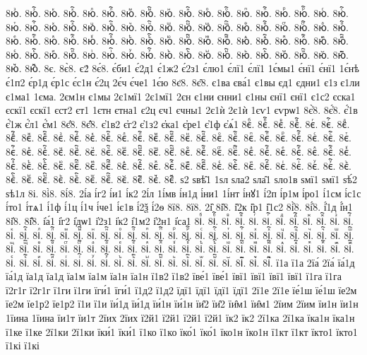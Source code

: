 {8юⷥ.
8юⷥ҇.
8юⷦ.
8юⷦ҇.
8юⷧ.
8юⷧ҇.
8юⷨ.
8юⷨ҇.
8юⷩ.
8юⷩ҇.
8юⷪ.
8юⷪ҇.
8юⷫ.
8юⷫ҇.
8юⷬ.
8юⷬ҇.
8юⷭ.
8юⷭ҇.
8юⷮ.
8юⷮ҇.
8юⷯ.
8юⷯ҇.
8юⷰ.
8юⷰ҇.
8юⷱ.
8юⷱ҇.
8юⷲ.
8юⷲ҇.
8юⷳ.
8юⷳ҇.
8юⷴ.
8юⷴ҇.
8юⷵ.
8юⷵ҇.
8юⷶ.
8юⷶ҇.
8юⷷ.
8юⷷ҇.
8юⷸ.
8юⷸ҇.
8юⷹ.
8юⷹ҇.
8юⷺ.
8юⷺ҇.
8юⷻ.
8юⷻ҇.
8юⷼ.
8юⷼ҇.
8юⷽ.
8юⷽ҇.
8юⷾ.
8юⷾ҇.
8юⷿ.
8юⷿ҇.
8юꙴ.
8юꙴ҇.
8юꙵ.
8юꙵ҇.
8юꙶ.
8юꙶ҇.
8юꙷ.
8юꙷ҇.
8юꙸ.
8юꙸ҇.
8юꙹ.
8юꙹ҇.
8юꙺ.
8юꙺ҇.
8юꙻ.
8юꙻ҇.
8ю꙼.
8ю꙼҇.
8ю꙽.
8ю꙽҇.
8є.
8є̀8.
є2́
8є́8.
є́би1
є́2д1
є́1ж2
є́2з1
є́лю1
є́лї1
є́лї1
1є́мы1
є́нї1
є́нї1
1є́нѣ
є́1п2
є́р1д
є́р1с
є́с1н
є́2ц
2є́ч
є́че1
1є́ю
8є̈8.
8є̑8.
є1ва
єва́1
є1вы
єд1
єдни1
є1з
є1ли
є1ма1
1єма.
2єм1н
є1мы
2є1мї1
2є1мї1
2єн
є1ни
єнни1
є1ны
єнї1
єнї1
є1с2
єска1
єскї1
єскї1
єст2
єт1
1єтн
єтна1
є2ц
єч1
єчны1
2є1ѝ
2є1ѝ
1єѵ1
єѵрѡ1
8є҆̀8.
8є҆́8.
є҆́1в
є҆́1ж
є҆́л1
є҆́м1
8є҆̈8.
8є҆̑8.
є҆1в2
є҆г2
є҆1з2
є҆ка1
є҆ре1
є҆1ф
є҆ѧ́1
8єⷠ.
8єⷠ҇.
8єⷡ.
8єⷡ҇.
8єⷢ.
8єⷢ҇.
8єⷣ.
8єⷣ҇.
8єⷤ.
8єⷤ҇.
8єⷥ.
8єⷥ҇.
8єⷦ.
8єⷦ҇.
8єⷧ.
8єⷧ҇.
8єⷨ.
8єⷨ҇.
8єⷩ.
8єⷩ҇.
8єⷪ.
8єⷪ҇.
8єⷫ.
8єⷫ҇.
8єⷬ.
8єⷬ҇.
8єⷭ.
8єⷭ҇.
8єⷮ.
8єⷮ҇.
8єⷯ.
8єⷯ҇.
8єⷰ.
8єⷰ҇.
8єⷱ.
8єⷱ҇.
8єⷲ.
8єⷲ҇.
8єⷳ.
8єⷳ҇.
8єⷴ.
8єⷴ҇.
8єⷵ.
8єⷵ҇.
8єⷶ.
8єⷶ҇.
8єⷷ.
8єⷷ҇.
8єⷸ.
8єⷸ҇.
8єⷹ.
8єⷹ҇.
8єⷺ.
8єⷺ҇.
8єⷻ.
8єⷻ҇.
8єⷼ.
8єⷼ҇.
8єⷽ.
8єⷽ҇.
8єⷾ.
8єⷾ҇.
8єⷿ.
8єⷿ҇.
8єꙴ.
8єꙴ҇.
8єꙵ.
8єꙵ҇.
8єꙶ.
8єꙶ҇.
8єꙷ.
8єꙷ҇.
8єꙸ.
8єꙸ҇.
8єꙹ.
8єꙹ҇.
8єꙺ.
8єꙺ҇.
8єꙻ.
8єꙻ҇.
8є꙼.
8є꙼҇.
8є꙽.
8є꙽҇.
ѕ2
ѕвѣ̑1
1ѕл
ѕла2
ѕла̑1
ѕло1в
ѕмї1
ѕмї1
ѕѣ́2
ѕѣ1л
8і.
8і̀8.
8і́8.
2і́а
і́г2
і́и1
і́к2
2і́л
1і́мв
і́н1д
і́ни1
1і́нт
і́нꙋ1
і́2п
і́р1м
і́ро1
і́1см
і́с1с
і́то1
і́тѧ1
і́1ф
і́1ц
і́1ч
і́че1
і́є1в
і́2ѯ
і́2ѳ
8ї8.
8ї8.
2і̑
8і̑8.
і̑2к
і̑р1
і̑1с2
8і҆̀8.
8і҆́8.
і҆́1д
і҆́н1
8і҆̈8.
8і҆̑8.
і҆а́1
і҆г2
і҆дѡ1
і҆2з1
і҆к2
і҆1м2
і҆2н1
і҆са1
8іⷠ.
8іⷠ҇.
8іⷡ.
8іⷡ҇.
8іⷢ.
8іⷢ҇.
8іⷣ.
8іⷣ҇.
8іⷤ.
8іⷤ҇.
8іⷥ.
8іⷥ҇.
8іⷦ.
8іⷦ҇.
8іⷧ.
8іⷧ҇.
8іⷨ.
8іⷨ҇.
8іⷩ.
8іⷩ҇.
8іⷪ.
8іⷪ҇.
8іⷫ.
8іⷫ҇.
8іⷬ.
8іⷬ҇.
8іⷭ.
8іⷭ҇.
8іⷮ.
8іⷮ҇.
8іⷯ.
8іⷯ҇.
8іⷰ.
8іⷰ҇.
8іⷱ.
8іⷱ҇.
8іⷲ.
8іⷲ҇.
8іⷳ.
8іⷳ҇.
8іⷴ.
8іⷴ҇.
8іⷵ.
8іⷵ҇.
8іⷶ.
8іⷶ҇.
8іⷷ.
8іⷷ҇.
8іⷸ.
8іⷸ҇.
8іⷹ.
8іⷹ҇.
8іⷺ.
8іⷺ҇.
8іⷻ.
8іⷻ҇.
8іⷼ.
8іⷼ҇.
8іⷽ.
8іⷽ҇.
8іⷾ.
8іⷾ҇.
8іⷿ.
8іⷿ҇.
8іꙴ.
8іꙴ҇.
8іꙵ.
8іꙵ҇.
8іꙶ.
8іꙶ҇.
8іꙷ.
8іꙷ҇.
8іꙸ.
8іꙸ҇.
8іꙹ.
8іꙹ҇.
8іꙺ.
8іꙺ҇.
8іꙻ.
8іꙻ҇.
8і꙼.
8і꙼҇.
8і꙽.
8і꙽҇.
ї1а
ї1а
2їа́
2їа́
їа́1д
їа́1д
їа1д
їа1д
їа1м
їа1м
їа1н
їа1н
ї1в2
ї1в2
їве́1
їве́1
ївї1
ївї1
ївї1
ївї1
ї1га
ї1га
ї2г1г
ї2г1г
ї1ги
ї1ги
їги́1
їги́1
ї1д2
ї1д2
їдї1
їдї1
їдї1
їдї1
2ї1е
2ї1е
їе́1ш
їе́1ш
їе2м
їе2м
їе1р2
їе1р2
ї1и
ї1и
їи́1д
їи́1д
їи́1н
їи́1н
їи̑2
їи̑2
їи̑м1
їи̑м1
2їим
2їим
їи1н
їи1н
1їина
1їина
їи1т
їи1т
2їих
2їих
ї2й1
ї2й1
ї2й1
ї2й1
їк2
їк2
2ї1ка
2ї1ка
їка1н
їка1н
ї1ке
ї1ке
2ї1ки
2ї1ки
їки́1
їки́1
ї1ко
ї1ко
їко́1
їко́1
їко1н
їко1н
ї1кт
ї1кт
їкто1
їкто1
ї1кі
ї1кі
}
